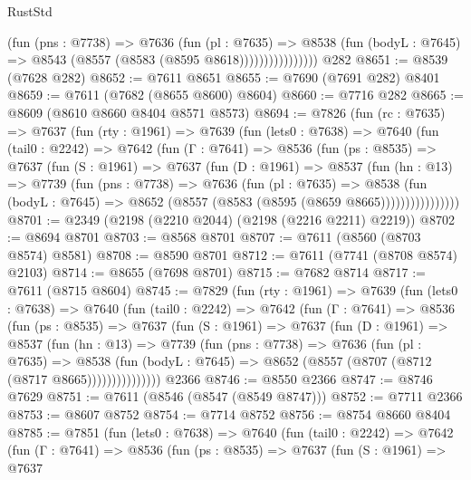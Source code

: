 \begin{lexlean}{RustStd}
\begin{coremodule}
                        (fun (pns : @7738) =>
                        @7636
                          (fun (pl : @7635) =>
                          @8538
                            (fun (bodyL : @7645) => @8543 (@8557 (@8583 (@8595 @8618))))))))))))))))
    @282
@8651 := @8539 (@7628 @282)
@8652 := @7611 @8651
@8655 := @7690 (@7691 @282) @8401
@8659 := @7611 (@7682 (@8655 @8600) @8604)
@8660 := @7716 @282
@8665 := @8609 (@8610 @8660 @8404 @8571 @8573)
@8694 := @7826
    (fun (rc : @7635) =>
    @7637
      (fun (rty : @1961) =>
      @7639
        (fun (lets0 : @7638) =>
        @7640
          (fun (tail0 : @2242) =>
          @7642
            (fun (Γ : @7641) =>
            @8536
              (fun (ps : @8535) =>
              @7637
                (fun (S : @1961) =>
                @7637
                  (fun (D : @1961) =>
                  @8537
                    (fun (hn : @13) =>
                    @7739
                      (fun (pns : @7738) =>
                      @7636
                        (fun (pl : @7635) =>
                        @8538
                          (fun (bodyL : @7645) =>
                          @8652 (@8557 (@8583 (@8595 (@8659 @8665))))))))))))))))
@8701 := @2349 (@2198 (@2210 @2044) (@2198 (@2216 @2211) @2219))
@8702 := @8694 @8701
@8703 := @8568 @8701
@8707 := @7611 (@8560 (@8703 @8574) @8581)
@8708 := @8590 @8701
@8712 := @7611 (@7741 (@8708 @8574) @2103)
@8714 := @8655 (@7698 @8701)
@8715 := @7682 @8714
@8717 := @7611 (@8715 @8604)
@8745 := @7829
    (fun (rty : @1961) =>
    @7639
      (fun (lets0 : @7638) =>
      @7640
        (fun (tail0 : @2242) =>
        @7642
          (fun (Γ : @7641) =>
          @8536
            (fun (ps : @8535) =>
            @7637
              (fun (S : @1961) =>
              @7637
                (fun (D : @1961) =>
                @8537
                  (fun (hn : @13) =>
                  @7739
                    (fun (pns : @7738) =>
                    @7636
                      (fun (pl : @7635) =>
                      @8538
                        (fun (bodyL : @7645) =>
                        @8652 (@8557 (@8707 (@8712 (@8717 @8665)))))))))))))))
    @2366
@8746 := @8550 @2366
@8747 := @8746 @7629
@8751 := @7611 (@8546 (@8547 (@8549 @8747)))
@8752 := @7711 @2366
@8753 := @8607 @8752
@8754 := @7714 @8752
@8756 := @8754 @8660 @8404
@8785 := @7851
    (fun (lets0 : @7638) =>
    @7640
      (fun (tail0 : @2242) =>
      @7642
        (fun (Γ : @7641) =>
        @8536
          (fun (ps : @8535) =>
          @7637
            (fun (S : @1961) =>
            @7637

\end{coremodule}
\end{lexlean}
